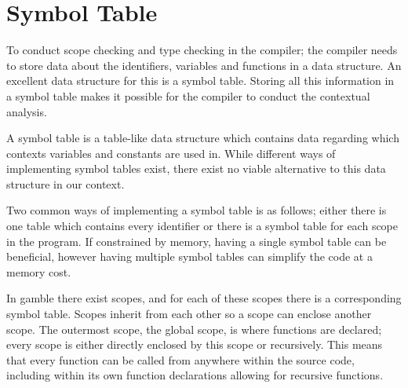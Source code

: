 \section{Symbol Table}
To conduct scope checking and type checking in the compiler; the compiler needs to store data about the identifiers, variables and functions in a data structure.
An excellent data structure for this is a symbol table.
Storing all this information in a symbol table makes it possible for the compiler to conduct the contextual analysis.

A symbol table is a table-like data structure which contains data regarding which contexts variables and constants are used in.
While different ways of implementing symbol tables exist, there exist no viable alternative to this data structure in our context.

Two common ways of implementing a symbol table is as follows; either there is one table which contains every identifier or there is a symbol table for each scope in the program.
If constrained by memory, having a single symbol table can be beneficial, however having multiple symbol tables can simplify the code at a memory cost. 

In \gls{gamble} there exist scopes, and for each of these scopes there is a corresponding symbol table. 
Scopes inherit from each other so a scope can enclose another scope. 
The outermost scope, the global scope, is where functions are declared; every scope is either directly enclosed by this scope or recursively.
This means that every function can be called from anywhere within the source code, including within its own function declarations allowing for recursive functions.

